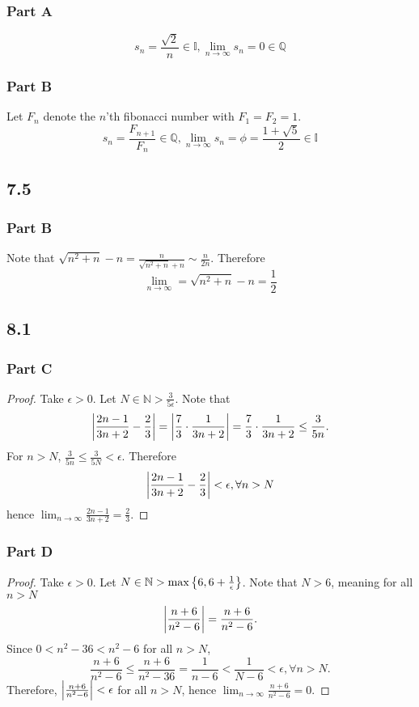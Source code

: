 \documentclass[12pt,titlepage]{extarticle}
\begin{document}
\subsubsection*{Part A}
\[
    s_n = \frac{\sqrt{2}}{n} \in \mathbb{I}, \lim_{n\to \infty} s_n = 0 \in \mathbb{Q}
\]

\subsubsection*{Part B}
Let $F_n$ denote the $n$'th fibonacci number with $F_1 = F_2 = 1$.
\[
    s_n = \frac{F_{n+1}}{F_n} \in \mathbb{Q}, \lim_{n\to \infty} s_n = \phi = \frac{1+\sqrt{5}}{2} \in \mathbb{I}
\]

\subsection*{7.5}
\subsubsection*{Part B}
Note that $\sqrt{n^2 + n} - n = \frac{n}{\sqrt{n^2+n} + n} \sim \frac{n}{2n}$. Therefore
\[
    \lim_{n\to\infty} = \sqrt{n^2 + n} - n = \frac{1}{2}
\]
\subsection*{8.1}
\subsubsection*{Part C}
\begin{proof}
    Take $\epsilon > 0$. Let $N \in \mathbb{N} > \frac{3}{5\epsilon}$. Note that
    \[
        \qty|\frac{2n-1}{3n+2} - \frac{2}{3}| = \qty|\frac{7}{3} \cdot \frac{1}{3n+2}| = \frac{7}{3} \cdot \frac{1}{3n+2} \leq \frac{3}{5n}.
    \]
    For $n > N$, $\frac{3}{5n} \leq \frac{3}{5 N} < \epsilon$. Therefore
    \[
        \qty|\frac{2n-1}{3n+2} - \frac{2}{3}| < \epsilon, \forall n > N
    \]
    hence $\lim_{n\to \infty} \frac{2n-1}{3n+2} = \frac{2}{3}$.
\end{proof}

\subsubsection*{Part D}
\begin{proof}
    Take $\epsilon > 0$. Let $N \in \mathbb{N} > \max\qty{6, 6 + \frac{1}{\epsilon}}$. Note that $N > 6$, meaning for all $n > N$
    \[
        \qty|\frac{n+6}{n^2 - 6}| = \frac{n+6}{n^2 - 6}.
    \]
    Since $0 < n^2 - 36 < n^2 - 6$ for all $n > N$,
    \[
        \frac{n+6}{n^2 - 6} \leq \frac{n+6}{n^2-36} = \frac{1}{n-6} < \frac{1}{N - 6} < \epsilon, \forall n > N.
    \]
    Therefore, $\qty|\frac{n+6}{n^2-6}| < \epsilon$ for all $n > N$, hence $\lim_{n \to \infty}\frac{n+6}{n^2-6} = 0$.
\end{proof}
\end{document}
